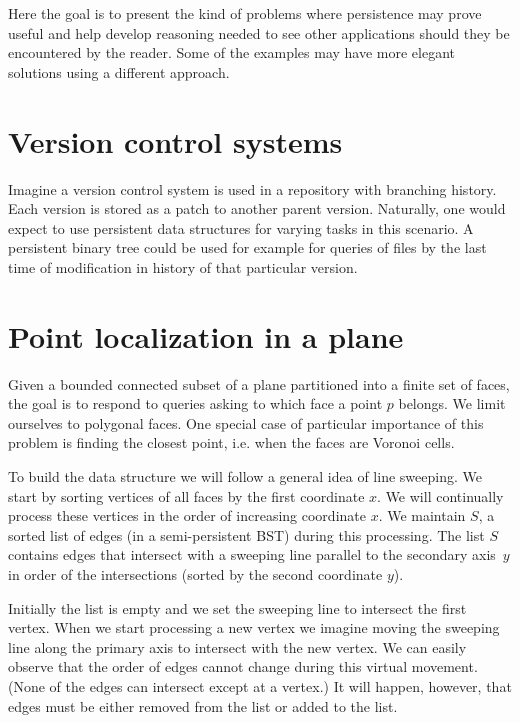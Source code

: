 Here the goal is to present the kind of problems where persistence may prove useful and help develop reasoning needed to see other applications should they be encountered by the reader. 
Some of the examples may have more elegant solutions using a different approach.

\section{Version control systems}

Imagine a version control system is used in a repository with branching history. Each version is stored as a patch to another parent version. Naturally, one would expect to use persistent data structures for varying tasks in this scenario. A persistent binary tree could be used for example for queries of files by the last time of modification in history of that particular version.

\section{Point localization in a plane}

Given a bounded connected subset of a plane partitioned into a finite set of faces, the goal is to respond to queries asking to which face a point $p$ belongs. We limit ourselves to polygonal faces.
One special case of particular importance of this problem is finding the closest point, i.e. when the faces are Voronoi cells.

To build the data structure we will follow a general idea of line sweeping. We start by sorting vertices of all faces by the first coordinate $x$. We will continually process these vertices in the order of increasing coordinate $x$. We maintain $S$, a sorted list of edges (in a semi-persistent BST) during this processing. The list $S$ contains edges that intersect with a sweeping line parallel to the secondary axis~$y$ in order of the intersections (sorted by the second coordinate $y$).

Initially the list is empty and we set the sweeping line to intersect the first vertex.
When we start processing a new vertex we imagine moving the sweeping line along the primary axis to intersect with the new vertex. We can easily observe that the order of edges cannot change during this virtual movement. (None of the edges can intersect except at a vertex.) It will happen, however, that edges must be either removed from the list or added to the list.

